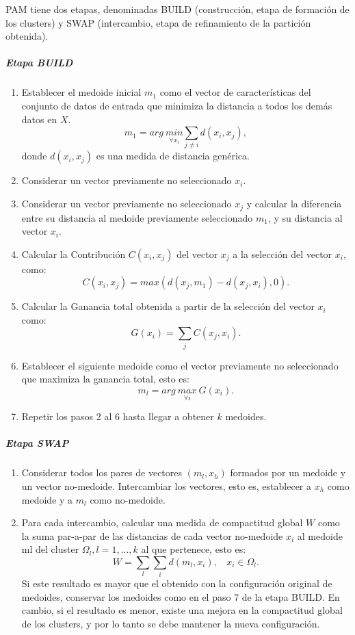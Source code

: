 \bigskip PAM tiene dos etapas, denominadas BUILD (construcción, etapa de formación de los clusters) y SWAP (intercambio, etapa de refinamiento de la partición obtenida).
\subparagraph{Etapa BUILD}
\begin{enumerate}
	\item Establecer el medoide inicial \(m_1\) como el vector de características del conjunto de datos de entrada que minimiza la distancia a todos los demás datos en \(X\).
\[m_1 = arg \> \underset{\forall x_i}{min} \sum_{j \neq i}d(x_i,x_j),\]
donde \(d(x_i,x_j)\) es una medida de distancia genérica.
	\item Considerar un vector previamente no seleccionado \(x_i\).
	\item Considerar un vector previamente no seleccionado \(x_j\) y calcular la diferencia entre su distancia al medoide previamente seleccionado \(m_1\), y su distancia al vector \(x_i\).
	\item Calcular la Contribución \(C(x_i,x_j)\) del vector \(x_j\) a la selección del vector \(x_i\), como:
\[C(x_i, x_j) = max(d(x_j, m_1) - d(x_j, x_i), 0).\]
	\item Calcular la Ganancia total obtenida a partir de la selección del vector \(x_i\) como:
\[G(x_i) = \sum_{j} C(x_j, x_i).\]
	\item Establecer el siguiente medoide como el vector previamente no seleccionado que maximiza la ganancia total, esto es:
\[m_l = arg \> \underset{\forall i}{max} \> G(x_i).\]
	\item Repetir los pasos 2 al 6 hasta llegar a obtener \(k\) medoides.
\end{enumerate}

\subparagraph{Etapa SWAP}
\begin{enumerate}
	\item Considerar todos los pares de vectores \((m_l,x_h)\) formados por un medoide y un vector no-medoide. Intercambiar los vectores, esto es, establecer a \(x_h\) como medoide y a \(m_l\) como no-medoide.
	\item Para cada intercambio, calcular una medida de compactitud global \(W\) como la suma par-a-par de las distancias de cada vector no-medoide \(x_i\) al medoide ml del cluster \(\Omega_l, l = 1,...,k\) al que pertenece, esto es:
	\[W = \sum_{l} \sum_{i} d(m_l, x_i), \:\:\:\: x_i \in \Omega_l.\]
	Si este resultado es mayor que el obtenido con la configuración original de medoides, conservar los medoides como en el paso 7 de la etapa BUILD. En cambio, si el resultado es menor, existe una mejora en la compactitud global de los clusters, y por lo tanto se debe mantener la nueva configuración.
\end{enumerate}

